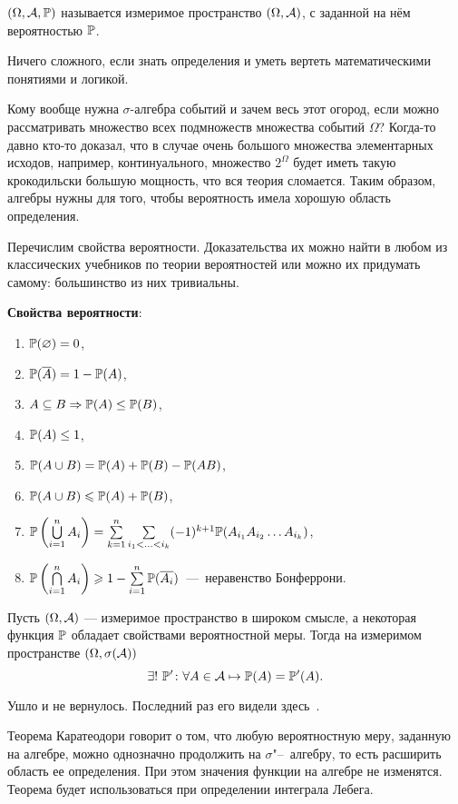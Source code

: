 \documentclass[../TV&MS.tex]{subfiles}
\begin{document}
\begin{Def}
	 $(\Omega, \mathcal{A}, \mathbb{P})$ называется измеримое 
	пространство $(\Omega, \mathcal{A})$, с заданной на нём вероятностью $\mathbb{P}$.
\end{Def}
	
Ничего сложного, если знать определения и уметь вертеть математическими понятиями и логикой.

\begin{Wtf}
	Кому вообще нужна $\sigma$-алгебра событий и зачем весь этот огород, если можно 
	рассматривать множество всех подмножеств множества событий $\Omega$? Когда-то давно кто-то 
	доказал, что в случае очень большого множества элементарных исходов, например, 
	континуального, множество $2^{\Omega}$ будет иметь такую крокодильски большую мощность, 
	что вся теория сломается. Таким образом, алгебры нужны для того, чтобы вероятность имела 
	хорошую область определения.
\end{Wtf}

	Перечислим свойства вероятности. Доказательства их можно найти в любом из
	классических учебников по теории вероятностей или можно их придумать самому:
	большинство из них тривиальны.

\textbf{Свойства вероятности}:
\begin{enumerate}
	\item $\mathbb{P} (\varnothing) = 0$, 
	\item $\mathbb{P} (\overline{A}) = 1 - \mathbb{P} (A)$,
	\item $A \subseteq B \Rightarrow \mathbb{P} (A) \le \mathbb{P} (B)$,
	\item $\mathbb{P} (A) \le 1$,
	\item $\mathbb{P} (A \cup B) = \mathbb{P} (A) + \mathbb{P} (B) - \mathbb{P} (AB)$, 
	\item $\mathbb{P} (A \cup B) \leqslant \mathbb{P} (A) + \mathbb{P} (B)$,
	\item $\mathbb{P} \left(\bigcup\limits_{i=1}^{n} A_i\right) = 
	\sum\limits_{k=1}^{n} \sum\limits_{i_1<\ldots <i_k} (-1)^{k+1} 
	\mathbb{P}(A_{i_1}A_{i_2}\ldots A_{i_k})$,
	\item $\mathbb{P} \left(\bigcap\limits_{i=1}^{n} A_i\right) \geqslant 1 - 
	\sum\limits_{i=1}^{n} \mathbb{P} (\overline{A_i})$~---~неравенство Бонферрони.
\end{enumerate}

\begin{Th}[Каратеодори]
Пусть $(\Omega, \mathcal{A})$ --- измеримое пространство в широком смысле, 
а некоторая функция $\mathbb{P}$ обладает свойствами вероятностной меры. 
Тогда на измеримом пространстве $(\Omega, \sigma(\mathcal{A}))$
$$
	\exists !\  \mathbb{P}' \colon \forall A \in \mathcal{A} \mapsto \mathbb{P}(A) = \mathbb{P}'(A).
$$
\end{Th}
\begin{Proof}
	Ушло и не вернулось. Последний раз его видели здесь~\cite{Gusev}.
\end{Proof}

\begin{Why}
	Теорема Каратеодори говорит о том, что любую вероятностную меру, 
	заданную на алгебре, можно однозначно продолжить на $\sigma$"--~алгебру, то есть расширить 
	область ее определения. При этом значения функции на алгебре не изменятся. Теорема будет 
	использоваться при определении интеграла Лебега.
\end{Why}
\newpage
\end{document}
